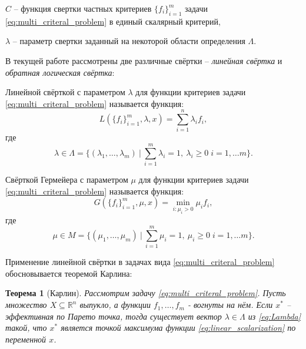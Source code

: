 $C$ – функция свертки частных критериев $\{f_i\}_{i=1}^m$ задачи 
\eqref{eq:multi_criteral_problem} в единый скалярный критерий,
 
$\lambda$ – параметр свертки заданный на некоторой
области определения $\Lambda$.
\newline

В текущей работе рассмотрены две различные свёртки --
\textit{линейная свёртка} и \textit{обратная логическая свёртка}:

\begin{Defenition}
	Линейной свёрткой с параметром $\lambda$ для функции критериев задачи
	\eqref{eq:multi_criteral_problem} называется 	\cite{ehrgott}
	функция:
	\begin{equation}
		\label{eq:linear_scalarization}
		L(\{f_i\}_{i=1}^{m}, \lambda, x) = 
		\sum_{i=1}^{n} \lambda_i f_i,
	\end{equation}
	где  
	\begin{equation}
		\label{eq:Lambda}
		\lambda \in 
		\Lambda = \{
			(\lambda_1, \ldots, \lambda_m) \:
			| \: \sum_{i=1}^m \lambda_i = 1, \: 
			  \lambda_i \geq 0 \; i = 1, \ldots m 
		\}.		
	\end{equation}
\end{Defenition}

\begin{Defenition}
	Свёрткой Гермейера с параметром $\mu$ для 
	функции критериев задачи \eqref{eq:multi_criteral_problem}
	называется \cite{germeyer} функция:
	\begin{equation}
		\label{eq:germeyer_scalarization}	
		G(\{f_i\}_{i=1}^{m}, \mu, x)=
		\min \limits_{i: \mu_i > 0} \mu_i f_i,
	\end{equation}
	где 
	\begin{equation}
		\label{eq:Mu}	
		\mu \in 
		M = \{
			(\mu_1, \ldots, \mu_m) \:
			| \: \sum_{i=1}^m \mu_i = 1, \: 
			  \mu_i \geq 0 \; i = 1, \ldots m 
		\}.
	\end{equation}
\end{Defenition}

Применение линейной свёртки в задачах вида
\eqref{eq:multi_criteral_problem} обосновывается теоремой Карлина:

\newtheorem{Theorem}{Теорема}
\begin{Theorem}[Карлин]
	Рассмотрим задачу \eqref{eq:multi_criteral_problem}. 
	Пусть множество $X \subseteq \mathbb{R}^n$ выпукло,
	а функции $f_1, \ldots, f_m$ - вогнуты на нём.
	Если $x^*$ – эффективная по Парето точка,
    тогда существует вектор $\lambda \in \Lambda$ из 
    \eqref{eq:Lambda} такой, что $x^*$ является точкой 
    максимума функции \eqref{eq:linear_scalarization} по переменной
    $x$. \cite{carlin}
\end{Theorem}

